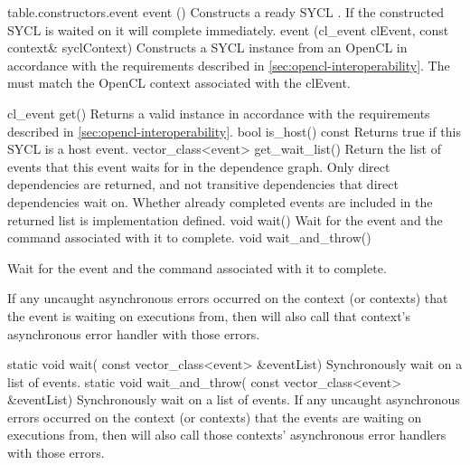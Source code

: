 
{table.constructors.event}
  \addRow
    {event ()}
    {  
      Constructs a ready SYCL . If the constructed SYCL  is waited on it will complete immediately.
    }
  \addRow
    {event (cl_event clEvent, const context\& syclContext)}
    {  
      Constructs a SYCL  instance from an OpenCL  in accordance with the requirements described in \ref{sec:opencl-interoperability}.    
      The  must match the OpenCL context associated
      with the clEvent.
    }
\completeTable

  \addRow
    {cl_event get()}
    {  
      Returns a valid  instance in accordance with the requirements described in \ref{sec:opencl-interoperability}.      
    }
  \addRow
    {bool is_host() const}
    {  
      Returns true if this SYCL  is a host event.     
    }
  \addRow
    {vector_class<event> get_wait_list()}
    {
      Return the list of events that this event waits for in
      the dependence graph.  Only direct dependencies are returned,
      and not transitive dependencies that direct dependencies wait on.
      Whether already completed events are included in the returned list
      is implementation defined.
    }
  \addRow
    {void wait()}
    {
      Wait for the event and the command associated with
      it to complete.
    }
  \addRow
    {void wait_and_throw()}
    {
      Wait for the event and the command associated with
      it to complete.

      If any uncaught asynchronous errors
      occurred on the context (or contexts) that the event
      is waiting on executions from, then will also call
      that context's asynchronous error handler with those
      errors.
    }
  \addRowTwoL
    {static void wait(}
    {  const vector_class<event> \&eventList)}
    {
      Synchronously wait on a list of events.
    }
  \addRowTwoL
    {static void wait_and_throw(}
    {const vector_class<event> \&eventList)}
    {
      Synchronously wait on a list of events.
      If any uncaught asynchronous errors occurred on
      the context (or contexts) that the events are waiting
      on executions from, then will also call those contexts'
      asynchronous error handlers with those errors.
    }

